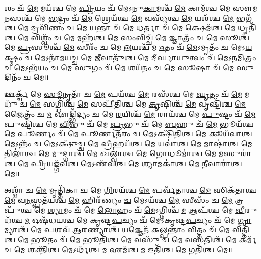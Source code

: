 𑌶𑌂 𑌚᳴ \ul{𑌮𑍇} 𑌮𑌯᳴𑌶𑍍𑌚 𑌮𑍇 \ul{𑌪𑍍𑌰𑌿}\-𑌯𑌂 𑌚᳴ 𑌮𑍇𑌽𑌨𑍁\-\ul{𑌕𑌾}\-𑌮𑌶𑍍𑌚᳴ \ul{𑌮𑍇} 𑌕𑌾𑌮᳴𑌶𑍍𑌚 𑌮𑍇 𑌸𑍗𑌮\-\ul{𑌨}\-𑌸𑌶𑍍𑌚᳴ 𑌮𑍇 \ul{𑌭}\-𑌦𑍍𑌰𑌂 𑌚᳴ \ul{𑌮𑍇} 𑌶𑍍𑌰𑍇𑌯᳴𑌶𑍍𑌚 \ul{𑌮𑍇} 𑌵𑌸𑍍𑌯᳴𑌶𑍍𑌚 \ul{𑌮𑍇} 𑌯𑌶᳴𑌶𑍍𑌚 \ul{𑌮𑍇} 𑌭𑌗᳴𑌶𑍍𑌚 \ul{𑌮𑍇} 𑌦𑍍𑌰𑌵𑌿᳴𑌣𑌂 𑌚 𑌮𑍇 \ul{𑌯}\-𑌨𑍍𑌤𑌾 𑌚᳴ 𑌮𑍇 \ul{𑌧}\-𑌰𑍍𑌤𑌾 𑌚᳴ \ul{𑌮𑍇} 𑌕𑍍𑌷𑍇𑌮᳴𑌶𑍍𑌚 \ul{𑌮𑍇} 𑌧𑍃𑌤𑌿᳴𑌶𑍍𑌚 \ul{𑌮𑍇} 𑌵𑌿𑌶𑍍𑌵𑌂᳴ 𑌚 \ul{𑌮𑍇} 𑌮𑌹᳴𑌶𑍍𑌚 𑌮𑍇 \ul{𑌸𑌂}\-𑌵𑌿𑌚𑍍𑌚᳴ \ul{𑌮𑍇} 𑌜𑍍𑌞𑌾𑌤𑍍𑌰𑌂᳴ 𑌚 \ul{𑌮𑍇} 𑌸𑍂𑌶𑍍𑌚᳴ 𑌮𑍇 \ul{𑌪𑍍𑌰}\-𑌸𑍂𑌶𑍍𑌚᳴ \ul{𑌮𑍇} 𑌸𑍀𑌰𑌂᳴ 𑌚 𑌮𑍇 \ul{𑌲}\-𑌯𑌶𑍍𑌚᳴ 𑌮 \ul{𑌋}\-𑌤𑌂 𑌚᳴ \ul{𑌮𑍇}\-𑌽𑌮𑍃𑌤𑌂᳴ 𑌚 𑌮𑍇𑌽\-\ul{𑌯}\-𑌕𑍍𑌷𑍍𑌮𑌂 \ul{𑌚} 𑌮𑍇𑌽𑌨𑌾᳴𑌮𑌯𑌚𑍍𑌚 𑌮𑍇 \ul{𑌜𑍀}\-𑌵𑌾𑌤𑍁᳴𑌶𑍍𑌚 𑌮𑍇 𑌦𑍀𑌰𑍍𑌘𑌾\-\ul{𑌯𑍁}\-𑌤𑍍𑌵𑌂 𑌚᳴ 𑌮𑍇𑌽𑌨\-\ul{𑌮𑌿}\-𑌤𑍍𑌰𑌂 \ul{𑌚} 𑌮𑍇𑌽𑌭᳴𑌯𑌂 𑌚 𑌮𑍇 \ul{𑌸𑍁}\-𑌗𑌂 𑌚᳴ \ul{𑌮𑍇} 𑌶𑌯᳴𑌨𑌂 𑌚 𑌮𑍇 \ul{𑌸𑍂}\-𑌷𑌾 𑌚᳴ 𑌮𑍇 \ul{𑌸𑍁}\-𑌦𑌿𑌨𑌂᳴ 𑌚 𑌮𑍇॥


𑌊𑌰𑍍𑌕𑍍𑌚᳴ 𑌮𑍇 \ul{𑌸𑍂}\-𑌨𑍃𑌤𑌾᳴ 𑌚 \ul{𑌮𑍇} 𑌪𑌯᳴𑌶𑍍𑌚 \ul{𑌮𑍇} 𑌰𑌸᳴𑌶𑍍𑌚 𑌮𑍇 \ul{𑌘𑍃}\-𑌤𑌂 𑌚᳴ \ul{𑌮𑍇} 𑌮𑌧𑍁᳴ 𑌚 \ul{𑌮𑍇} 𑌸𑌗𑍍𑌧𑌿᳴𑌶𑍍𑌚 \ul{𑌮𑍇} 𑌸𑌪𑍀᳴𑌤𑌿𑌶𑍍𑌚 𑌮𑍇 \ul{𑌕𑍃}\-𑌷𑌿𑌶𑍍𑌚᳴ \ul{𑌮𑍇} 𑌵𑍃𑌷𑍍𑌟𑌿᳴𑌶𑍍𑌚 \ul{𑌮𑍇} 𑌜𑍈𑌤𑍍𑌰𑌂᳴ 𑌚 \ul{𑌮} 𑌔𑌦𑍍𑌭𑌿᳴𑌦𑍍𑌯𑌂 𑌚 𑌮𑍇 \ul{𑌰}\-𑌯𑌿𑌶𑍍𑌚᳴ \ul{𑌮𑍇} 𑌰𑌾𑌯᳴𑌶𑍍𑌚 𑌮𑍇 \ul{𑌪𑍁}\-𑌷𑍍𑌟𑌂 𑌚᳴ \ul{𑌮𑍇} 𑌪𑍁𑌷𑍍𑌟𑌿᳴𑌶𑍍𑌚 𑌮𑍇 \ul{𑌵𑌿}\-𑌭𑍁 𑌚᳴ 𑌮𑍇 \ul{𑌪𑍍𑌰}\-𑌭𑍁 𑌚᳴ 𑌮𑍇 \ul{𑌬}\-𑌹𑍁 𑌚᳴ \ul{𑌮𑍇} 𑌭𑍂𑌯᳴𑌶𑍍𑌚 𑌮𑍇 \ul{𑌪𑍂}\-𑌰𑍍𑌣𑌂 𑌚᳴ 𑌮𑍇 \ul{𑌪𑍂}\-𑌰𑍍𑌣𑌤᳴𑌰𑌂 \ul{𑌚} 𑌮𑍇𑌽𑌕𑍍𑌷𑌿᳴𑌤𑌿𑌶𑍍𑌚 \ul{𑌮𑍇} 𑌕𑍂𑌯᳴𑌵𑌾\-\ul{𑌶𑍍𑌚} 𑌮𑍇𑌽𑌨𑍍𑌨𑌂᳴ \ul{𑌚} 𑌮𑍇𑌽𑌕𑍍𑌷𑍁᳴𑌚𑍍𑌚 𑌮𑍇 \ul{𑌵𑍍𑌰𑍀}\-𑌹𑌯᳴𑌶𑍍𑌚 \ul{𑌮𑍇} 𑌯𑌵𑌾॑𑌶𑍍𑌚 \ul{𑌮𑍇} 𑌮𑌾𑌷𑌾॑𑌶𑍍𑌚 \ul{𑌮𑍇} 𑌤𑌿𑌲𑌾॑𑌶𑍍𑌚 𑌮𑍇 \ul{𑌮𑍁}\-𑌦𑍍𑌗𑌾𑌶𑍍𑌚᳴ 𑌮𑍇 \ul{𑌖}\-𑌲𑍍𑌵𑌾॑𑌶𑍍𑌚 𑌮𑍇 \ul{𑌗𑍋}\-𑌧𑍂𑌮𑌾॑𑌶𑍍𑌚 𑌮𑍇 \ul{𑌮}\-𑌸𑍁𑌰𑌾॑𑌶𑍍𑌚 𑌮𑍇 \ul{𑌪𑍍𑌰𑌿}\-𑌯𑌙𑍍𑌗᳴𑌵\-\ul{𑌶𑍍𑌚} 𑌮𑍇𑌽𑌣᳴𑌵𑌶𑍍𑌚 𑌮𑍇 \ul{𑌶𑍍𑌯𑌾}\-𑌮𑌕𑌾॑𑌶𑍍𑌚 𑌮𑍇 \ul{𑌨𑍀}\-𑌵𑌾𑌰𑌾॑𑌶𑍍𑌚 𑌮𑍇॥ 


𑌅𑌶𑍍𑌮𑌾᳴ 𑌚 \ul{𑌮𑍇} 𑌮𑍃𑌤𑍍𑌤𑌿᳴𑌕𑌾 𑌚 𑌮𑍇 \ul{𑌗𑌿}\-𑌰𑌯᳴𑌶𑍍𑌚 \ul{𑌮𑍇} 𑌪𑌰𑍍𑌵᳴𑌤𑌾𑌶𑍍𑌚 \ul{𑌮𑍇} 𑌸𑌿𑌕᳴𑌤𑌾𑌶𑍍𑌚 \ul{𑌮𑍇} 𑌵\-\ul{𑌨}\-𑌸𑍍𑌪𑌤᳴𑌯𑌶𑍍𑌚 \ul{𑌮𑍇} 𑌹𑌿𑌰᳴𑌣𑍍𑌯𑌂 \ul{𑌚} 𑌮𑍇𑌽𑌯᳴𑌶𑍍𑌚 \ul{𑌮𑍇} 𑌸𑍀𑌸𑌂᳴ 𑌚 \ul{𑌮𑍇} 𑌤𑍍𑌰𑌪𑍁᳴𑌶𑍍𑌚 𑌮𑍇 \ul{𑌶𑍍𑌯𑌾}\-𑌮𑌂 𑌚᳴ 𑌮𑍇 \ul{𑌲𑍋}\-𑌹𑌂 𑌚᳴ \ul{𑌮𑍇}\-𑌽𑌗𑍍𑌨𑌿𑌶𑍍𑌚᳴ \ul{𑌮} 𑌆𑌪᳴𑌶𑍍𑌚 𑌮𑍇 \ul{𑌵𑍀}\-𑌰𑍁𑌧᳴𑌶𑍍𑌚 \ul{𑌮} 𑌓𑌷᳴𑌧𑌯𑌶𑍍𑌚 𑌮𑍇 𑌕𑍃𑌷𑍍𑌟\-\ul{𑌪}\-𑌚𑍍𑌯𑌂 𑌚᳴ 𑌮𑍇𑌽𑌕𑍃𑌷𑍍𑌟\-\ul{𑌪}\-𑌚𑍍𑌯𑌂 𑌚᳴ 𑌮𑍇 \ul{𑌗𑍍𑌰𑌾}\-𑌮𑍍𑌯𑌾𑌶𑍍𑌚᳴ 𑌮𑍇 \ul{𑌪}\-𑌶𑌵᳴ 𑌆\-\ul{𑌰}\-𑌣𑍍𑌯𑌾𑌶𑍍𑌚᳴ \ul{𑌯}\-𑌜𑍍𑌞𑍇𑌨᳴ 𑌕𑌲𑍍𑌪𑌨𑍍𑌤𑌾𑌂 \ul{𑌵𑌿}\-𑌤𑍍𑌤𑌂 𑌚᳴ \ul{𑌮𑍇} 𑌵𑌿𑌤𑍍𑌤𑌿᳴𑌶𑍍𑌚 𑌮𑍇 \ul{𑌭𑍂}\-𑌤𑌂 𑌚᳴ \ul{𑌮𑍇} 𑌭𑍂𑌤𑌿᳴𑌶𑍍𑌚 \ul{𑌮𑍇} 𑌵𑌸𑍁᳴ 𑌚 𑌮𑍇 𑌵\-\ul{𑌸}\-𑌤𑌿𑌶𑍍𑌚᳴ \ul{𑌮𑍇} 𑌕𑌰𑍍𑌮᳴ 𑌚 \ul{𑌮𑍇} 𑌶𑌕𑍍𑌤𑌿᳴\-\ul{𑌶𑍍𑌚} 𑌮𑍇𑌽𑌰𑍍𑌥᳴𑌶𑍍𑌚 \ul{𑌮} 𑌏𑌮᳴𑌶𑍍𑌚 \ul{𑌮} 𑌇𑌤𑌿᳴𑌶𑍍𑌚 \ul{𑌮𑍇} 𑌗𑌤𑌿᳴𑌶𑍍𑌚 𑌮𑍇॥

